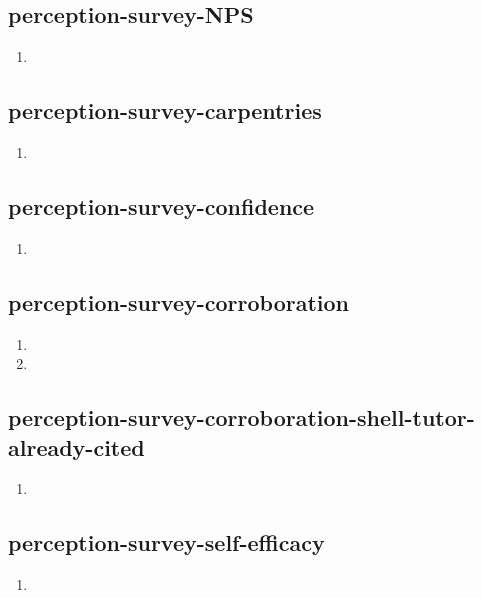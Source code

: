 \documentclass{article}
\begin{document}
\subsection{perception-survey-NPS}
\begin{enumerate}
\item {}
\end{enumerate}

\subsection{perception-survey-carpentries}
\begin{enumerate}
\item {}
\end{enumerate}

\subsection{perception-survey-confidence}
\begin{enumerate}
\item {}
\end{enumerate}

\subsection{perception-survey-corroboration}
\begin{enumerate}
\item {}
\item {}
\end{enumerate}

\subsection{perception-survey-corroboration-shell-tutor-already-cited}
\begin{enumerate}
\item {}
\end{enumerate}

\subsection{perception-survey-self-efficacy}
\begin{enumerate}
\item {}
\end{enumerate}
\end{document}
